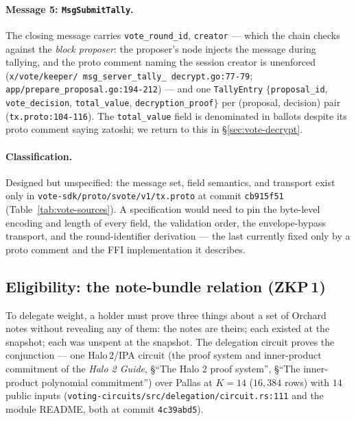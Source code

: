 \documentclass[11pt,a4paper]{article}
\theoremstyle{definition}
\begin{document}
\paragraph{Message 5: \texttt{MsgSubmitTally}.} The closing message carries
\texttt{vote\_round\_id}, \texttt{creator} --- which the chain checks
against the \emph{block proposer}: the proposer's node injects the message
during tallying, and the proto comment naming the session creator is
unenforced (\texttt{x/\allowbreak vote/\allowbreak keeper/\allowbreak
msg\_\allowbreak server\_\allowbreak tally\_\allowbreak
decrypt.go:77-79};
\texttt{app/prepare\_proposal.go:194-212}) --- and one \texttt{TallyEntry}
$\{$\texttt{proposal\_id}, \texttt{vote\_decision}, \texttt{total\_value},
\texttt{decryption\_proof}$\}$ per (proposal, decision) pair
(\texttt{tx.proto:104-116}). The \texttt{total\_value} field is denominated
in ballots despite its proto comment saying zatoshi; we return to this in
\S\ref{sec:vote-decrypt}.

\paragraph{Classification.} Designed but unspecified: the message set,
field semantics, and transport exist only in
\texttt{vote-sdk/proto/svote/v1/tx.proto} at commit \texttt{cb915f51}
(Table~\ref{tab:vote-sources}). A specification would need to pin the
byte-level encoding and length of every field, the validation order, the
envelope-bypass transport, and the round-identifier derivation --- the last
currently fixed only by a proto comment and the FFI implementation it
describes.

\subsection{Eligibility: the note-bundle relation
(\texorpdfstring{ZKP\,1}{ZKP 1})}
\label{sec:vote-zkp1}

To delegate weight, a holder must prove three things about a set of Orchard
notes without revealing any of them: the notes are theirs; each existed at
the snapshot; each was unspent at the snapshot. The delegation circuit
proves the conjunction --- one Halo\,2/IPA circuit (the proof system and
inner-product commitment of the \emph{Halo 2 Guide}, \S``The Halo 2 proof
system'', \S``The inner-product polynomial commitment'') over Pallas at
$K=14$ ($16{,}384$ rows) with $14$ public inputs
(\texttt{voting-circuits/src/delegation/circuit.rs:111} and the module
README, both at commit \texttt{4c39abd5}).
\end{document}

